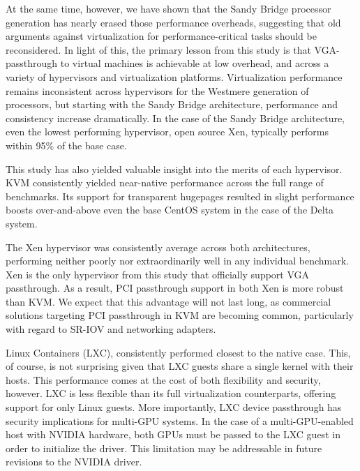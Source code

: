 At the same time, however, we have shown that the Sandy Bridge
processor generation has nearly erased those performance overheads, suggesting
that old arguments against virtualization for performance-critical tasks should
be reconsidered.  In light of this, the primary lesson from this study is that VGA-passthrough to
virtual machines is achievable at low overhead, and across a variety of
hypervisors and virtualization platforms.  Virtualization performance remains
inconsistent across hypervisors for the Westmere generation of processors, but
starting with the Sandy Bridge architecture, performance and consistency
increase dramatically.  In the case of the Sandy Bridge architecture, even the lowest performing hypervisor, open source Xen, typically
performs within 95\% of the base case.

This study has also yielded valuable insight into the merits of each hypervisor.
KVM consistently yielded near-native performance across the full range of
benchmarks.  Its support for transparent hugepages resulted in slight
performance boosts over-and-above even the base CentOS system in the case of the
Delta system.  



The Xen hypervisor was consistently average across both architectures,
performing neither poorly nor extraordinarily well in any individual benchmark.
Xen is the only  hypervisor from this study that officially support VGA
passthrough.  As a result, PCI passthrough support in both Xen  is
more robust than KVM.  We expect that this advantage will not last long, as
commercial solutions targeting PCI passthrough in KVM are becoming
common, particularly with regard to SR-IOV and networking adapters.

Linux Containers (LXC), consistently performed closest to the native case.
This, of course, is not surprising given that LXC guests share a
single kernel with their hosts.  This performance comes at the cost of both
flexibility and security, however.  LXC is less flexible than its full
virtualization counterparts, offering
support for only Linux guests.  More importantly, LXC device
passthrough has security implications for multi-GPU systems.  In the case of
a multi-GPU-enabled host with NVIDIA hardware, both GPUs must be passed to the
LXC guest in order to initialize the driver.  This limitation may be addressable
in future revisions to the NVIDIA driver. 


